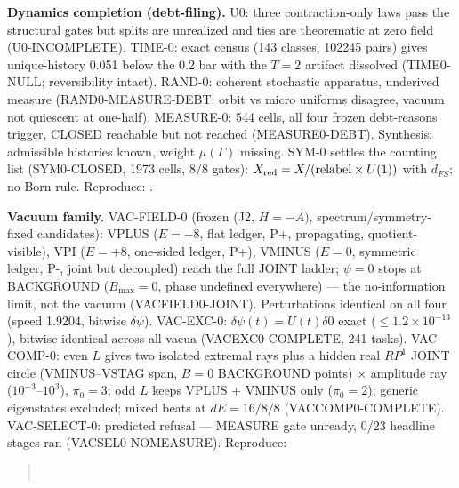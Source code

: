 \documentclass[11pt]{article}
\begin{document}
\textbf{Dynamics completion (debt-filing).} U0: three contraction-only
laws pass the structural gates but splits are unrealized and ties are
theorematic at zero field (U0-INCOMPLETE). TIME-0: exact census (143
classes, 102245 pairs) gives unique-history 0.051 below the 0.2 bar
with the $T{=}2$ artifact dissolved (TIME0-NULL; reversibility intact).
RAND-0: coherent stochastic apparatus, underived measure
(RAND0-MEASURE-DEBT: orbit vs micro uniforms disagree, vacuum not
quiescent at one-half). MEASURE-0: 544 cells, all four frozen
debt-reasons trigger, CLOSED reachable but not reached (MEASURE0-DEBT).
Synthesis: admissible histories known, weight $\mu(\Gamma)$ missing.
SYM-0 settles the counting list (SYM0-CLOSED, 1973 cells, 8/8 gates):
$X_{\rm red} = X/(\mathrm{relabel} \times U(1))$ with $d_{FS}$; no Born
rule.
Reproduce: .

\textbf{Vacuum family.} VAC-FIELD-0 (frozen (J2, $H{=}{-}A)$,
spectrum/symmetry-fixed candidates): VPLUS ($E{=}{-}8$, flat ledger,
P+, propagating, quotient-visible), VPI ($E{=}{+}8$, one-sided ledger,
P+), VMINUS ($E{=}0$, symmetric ledger, P-, joint but decoupled) reach
the full JOINT ladder; $\psi = 0$ stops at BACKGROUND
($B_{\max} = 0$, phase undefined everywhere) --- the no-information
limit, not the vacuum (VACFIELD0-JOINT). Perturbations identical on all
four (speed 1.9204, bitwise $\delta\psi$). VAC-EXC-0: $\delta\psi(t) =
U(t)\delta0$ exact ($\le 1.2\times 10^{-13}$), bitwise-identical across
all vacua (VACEXC0-COMPLETE, 241 tasks). VAC-COMP-0: even $L$ gives two
isolated extremal rays plus a hidden real $RP^1$ JOINT circle
(VMINUS--VSTAG span, $B{=}0$ BACKGROUND points) $\times$ amplitude ray
($10^{-3}$--$10^3$), $\pi_0 = 3$; odd $L$ keeps VPLUS + VMINUS only
($\pi_0 = 2$); generic eigenstates excluded; mixed beats at
$dE = 16/8/8$ (VACCOMP0-COMPLETE). VAC-SELECT-0: predicted refusal ---
MEASURE gate unready, 0/23 headline stages ran (VACSEL0-NOMEASURE).
Reproduce:
\begin{quote}\small
{}\\
\end{quote}
\end{document}
